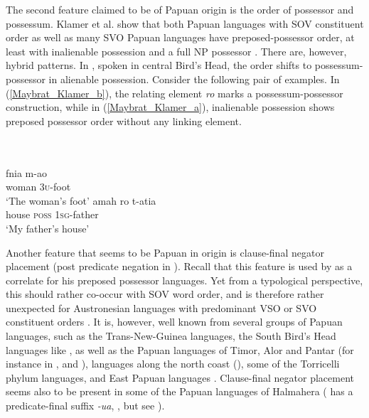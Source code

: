 The second feature claimed to be of Papuan origin is the order of possessor and possessum. Klamer et al. show that both Papuan languages with SOV constituent order as well as many SVO Papuan languages have preposed-possessor order, at least with inalienable possession and a full NP possessor \citep[123f.]{klamer2008east}. There are, however, hybrid patterns. In , spoken in central Bird's Head, the order shifts to possessum-possessor in alienable possession. Consider the following pair of examples. In (\ref{Maybrat_Klamer_b}), the relating element \textit{ro} marks a possessum-possessor construction, while in (\ref{Maybrat_Klamer_a}), inalienable possession shows preposed possessor order without any linking element.

\ea
{}\\
\\
\ea \label{Maybrat_Klamer_a}
\gll fnia m-ao\\
woman \textsc{3}\textsc{u}-foot\\
\glt ‘The woman's foot’
\ex \label{Maybrat_Klamer_b}
\gll amah ro t-atia\\
house \textsc{poss} \textsc{1}\textsc{sg}-father\\
\glt ‘My father's house’
\z
\z

Another feature that seems to be Papuan in origin is clause-final negator placement (post predicate negation in \citealt{klamer2008east}). Recall that this feature is used by \citet{Himmelmann2005austronesian} as a correlate for his preposed possessor languages. Yet from a typological perspective, this should rather co-occur with SOV word order, and is therefore rather unexpected for Austronesian languages with predominant VSO or SVO constituent orders \citep{klamer2008east}. It is, however, well known from several groups of Papuan languages, such as the Trans-New-Guinea languages, the South Bird's Head languages like , as well as the Papuan languages of Timor, Alor and Pantar (for instance in ,  and ),  languages along the north coast (), some of the Torricelli phylum languages, and East Papuan languages \citep{klamer2008east}. Clause-final negator placement seems also to be present in some of the Papuan languages of Halmahera ( has a predicate-final suffix \textit{-ua}, \citealt{holton2003tobelo}, but see \citealt[131]{klamer2008east}).

